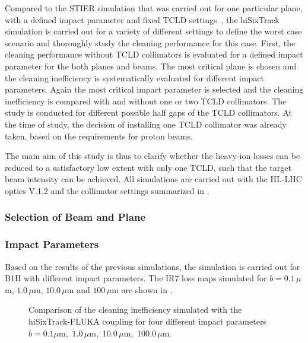 Compared to the STIER simulation that was carried out for one particular plane, with a defined impact parameter and fixed TCLD settings~\cite{phermes_ipac2015_1}, the hiSixTrack simulation is carried out for a variety of different settings to define the worst case scenario and thoroughly study the cleaning performance for this case. First, the cleaning performance without TCLD collimators is evaluated for a defined impact parameter for the both planes and beams. The most critical plane is chosen and the cleaning inefficiency is systematically evaluated for different impact parameters. Again the most critical impact parameter is selected and the cleaning inefficiency is compared with and without one or two TCLD collimators. The study is conducted for different possible half gaps of the TCLD collimators. At the time of study, the decision of installing one TCLD collimator was already taken, based on the requirements for proton beams. 

The main aim of this study is thus to clarify whether the heavy-ion losses can be reduced to a satisfactory low extent with only one TCLD, such that the target beam intensity can be achieved. All simulations are carried out with the HL-LHC optics V.1.2 and the collimator settings summarized in .

\subsubsection{Selection of Beam and Plane}


\subsubsection{Impact Parameters}


Based on the results of the previous simulations, the simulation is carried out for B1H with different impact parameters. The IR7 loss maps simulated for $b=0.1\,\mu$m, $1.0\,\mu$m, $10.0\,\mu$m and $100\,\mu$m are shown in . 


\begin{figure}[t]
  \centering
  \caption{Comparison of the cleaning inefficiency simulated with the hiSixTrack-FLUKA coupling for four different impact parameters \mbox{$b=0.1\mu$m, $1.0\,\mu$m, 10.0$\,\mu$m, 100.0$\,\mu$m}. }  
  \label{pic:16062201}
  \end{figure}


